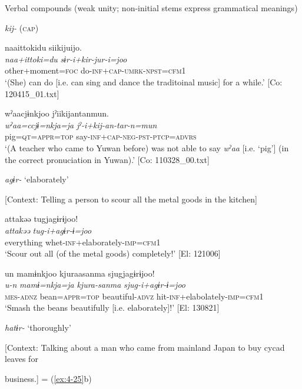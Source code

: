 \ea\label{ex:8-148}
  Verbal compounds (weak unity; non-initial stems express grammatical meanings)

  \textit{kij-} (\textsc{cap})

\ea
{\TM}
\glll  naa{\textbar}ittoki{\textbar}du  siikijuijo.\\
\textit{naa+ittoki=du}  \textit{sɨr-i+kir-jur-i=joo}\\
other+moment=\textsc{foc}  do-\textsc{inf}+\textsc{cap}-\textsc{umrk}-\textsc{npst}=\textsc{cfm1}\\
\glt ‘(She) can do [i.e. can sing and dance the traditoinal music] for a while.’ [Co: 120415\_01.txt]

\ex
{\TM}
\glll  wˀaacjɨnkjoo  jˀiikijantanmun.\\
\textit{wˀaa=ccjɨ=nkja=ja}  \textit{jˀ-i+kij-an-tar-n=mun}\\
pig=\textsc{qt}=\textsc{appr}=\textsc{top}  say-\textsc{inf}+\textsc{cap}-\textsc{neg}-\textsc{pst}-\textsc{ptcp}=\textsc{advrs}\\
\glt ‘(A teacher who came to Yuwan before) was not able to say \textit{wˀaa} [i.e. ‘pig’] (in the correct pronuciation in Yuwan).’ [Co: 110328\_00.txt]

  \textit{agɨr-} ‘elaborately’


\ex {}[Context: Telling a person to scour all the metal goods in the kitchen]

{\TM}
\glll  attakəə  tugjagɨrɨjoo!\\
\textit{attakəə}  \textit{tug-i+agɨr-ɨ=joo}\\
everything  whet-\textsc{inf}+elaborately-\textsc{imp}=\textsc{cfm1}\\
\glt ‘Scour out all (of the metal goods) completely!’ [El: 121006]

\ex
{\TM}
\glll  un  mamɨnkjoo  kjuraasanma  sjugjagɨrɨjoo!\\
\textit{u-n}  \textit{mamɨ=nkja=ja}  \textit{kjura-sanma}  \textit{sjug-i+agɨr-ɨ=joo}\\
\textsc{mes}-\textsc{adnz}  bean=\textsc{appr}=\textsc{top}  beautiful-\textsc{advz}  hit-\textsc{inf}+elabolately-\textsc{imp}=\textsc{cfm1}\\
\glt ‘Smash the beans beautifully [i.e. elaborately]!’ [El: 130821]

  \textit{hatɨr-} ‘thoroughly’


\ex{} [Context: Talking about a man who came from mainland Japan to buy cycad leaves for

business.] = (\ref{ex:4-25}b)

